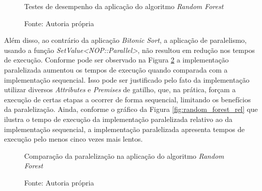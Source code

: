 \begin{figure}[!htb]
  \centering
  \caption{Testes de desempenho da aplicação do algoritmo \textit{Random
  Forest}}
  \caption*{Fonte: Autoria própria}
  \label{fig:rf_bench}
  \end{figure}

Além disso, ao contrário da aplicação \textit{Bitonic Sort}, a aplicação de
paralelismo, usando a função \textit{SetValue<NOP::Parallel>}, não resultou em
redução nos tempos de execução. Conforme pode ser observado na Figura
\ref{fig:random_forest_par} a implementação paralelizada aumentou os tempos de
execução quando comparada com a implementação sequencial. Isso pode ser
justificado pelo fato da implementação utilizar diversos \textit{Attributes} e
\textit{Premises} de gatilho, que, na prática, forçam a execução de certas
etapas a ocorrer de forma sequencial, limitando os benefícios da paralelização.
Ainda, conforme o gráfico da Figura \ref{fig:random_forest_rel} que ilustra o
tempo de execução da implementação paralelizada relativo ao da implementação
sequencial, a implementação paralelizada apresenta tempos de execução pelo menos
cinco vezes mais lentos.

\begin{figure}[!htb]
\centering
{}
\caption{Comparação da paralelização na aplicação do algoritmo \textit{Random
Forest}}
\caption*{Fonte: Autoria própria}
\label{fig:random_forest_par}
\end{figure}


